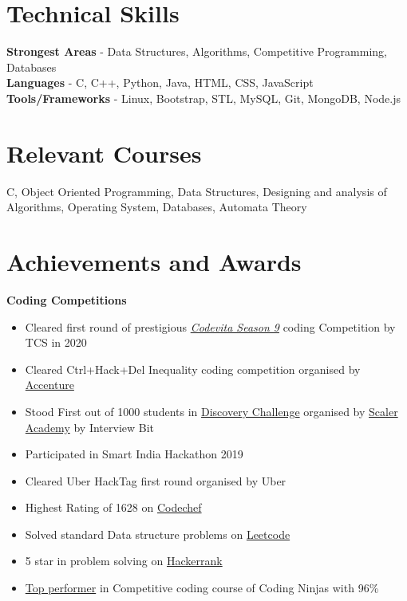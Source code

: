 \documentclass[margin, centered]{res}
\begin{document}
\begin{resume}
\section{Technical \hspace{2mm} Skills}
\textbf{Strongest Areas} - Data Structures, Algorithms, Competitive Programming, Databases \\
\textbf{Languages} - C, C++, Python, Java, HTML, CSS, JavaScript  \\
\textbf{Tools/Frameworks} - Linux, Bootstrap, STL, MySQL, Git, MongoDB, Node.js


\section{Relevant \hspace{2mm} Courses}
C, Object Oriented Programming, Data Structures, Designing and analysis of Algorithms, Operating System, Databases, Automata Theory


\section{Achievements and Awards}
\textbf{Coding Competitions}
\begin{itemize}[leftmargin=*]
 \item Cleared first round of prestigious  \href{https://drive.google.com/file/d/16OY0sqsJXUs4BXPSdkCaoF_2f4SIdxKI/view?usp=sharing}{\emph{Codevita Season 9}} coding Competition by TCS in 2020
 \item Cleared Ctrl+Hack+Del Inequality coding competition organised by \href{https://www.accenture.com/in-en}{Accenture}
 \item Stood First out of 1000 students in  \href{https://drive.google.com/file/d/1IO5cW3NQkcZCm8p65HSRLOaKHfI16ZbS/view?usp=sharing}{Discovery Challenge} organised by \href{https://www.scaler.com/}{Scaler Academy} by Interview Bit
 \item Participated in Smart India Hackathon 2019
 \item Cleared Uber HackTag first round organised by Uber
 \item Highest Rating of 1628 on \href{https://www.codechef.com/users/tannu_kumari}{Codechef}
 \item Solved standard Data structure problems on \href{https://leetcode.com/tannu_kumari/}{Leetcode}
 \item 5 star in problem solving on \href {https://www.hackerrank.com/tannuchoudhary10}{Hackerrank}
 \item \href{https://drive.google.com/file/d/1kJhDdn9UZug1x1Rb8qo6iefYvjDPisYn/view?usp=sharing}{Top performer} in Competitive coding course of Coding Ninjas with 96\%
 

\end{itemize}
\end{resume}
\end{document}
